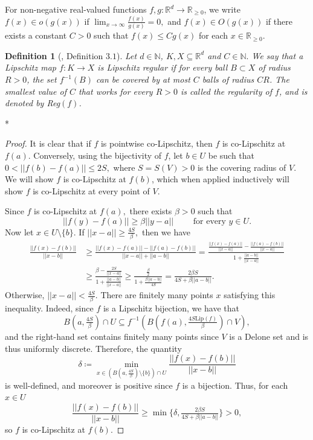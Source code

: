 \documentclass{article}
\newtheorem{define}[thm]{Definition}
\newcommand{\R}{\mathbb{R}}
\newcommand{\N}{\mathbb{N}}
\newcommand{\bilip}{\operatorname{bilip}}
\begin{document}
For non-negative real-valued functions $f,g:\R^d \to \R_{\geq 0}$, we write
    $f(x) \in o(g(x))$ if $\lim_{x \to \infty} \frac{f(x)}{g(x)} = 0,$ and $f(x) \in O(g(x))$ if there exists a constant $C>0$ such that $f(x) \leq Cg(x)$ for each $x \in \R_{\geq0}.$
    \begin{define}[\cite{viera2023delone}, Definition $3.1$] \label{define: lip reg}
    Let $d \in \N$, $K,X \subseteq \R^d$ and $C \in \N.$ We say that a Lipschitz map $f:K \to X$ is \emph{Lipschitz regular} if for every ball $B \subset X$ of radius $R > 0$, the set $f^{-1}(B)$ can
be covered by at most $C$ balls of radius $CR$. The smallest value of $C$ that works for every $R>0$ is called
the \emph{regularity} of $f$, and is denoted by \emph{Reg}$(f)$. 
\end{define}
    \bilip*
\begin{proof}
   It is clear that if $f$ is pointwise co-Lipschitz, then $f$ is co-Lipschitz at $f(a)$. Conversely, using the bijectivity of $f$, let $b \in U$ be such that $0<||f(b)-f(a)|| \leq 2S,$ where $S=S(V)>0$ is the covering radius of $V.$ We will show $f$ is co-Lipschitz at $f(b)$, which when applied inductively will show $f$ is co-Lipschitz at every point of $V$.
   
   Since $f$ is co-Lipschitz at $f(a),$ there exists $\beta>0$ such that $$||f(y)-f(a)|| \geq \beta||y-a||\qquad \text{ for every } y \in U .$$ Now let $x \in U\setminus \{b\}$. If $||x-a||\geq \frac{4S}{\beta},$ then we have 
    \begin{equation*} \label{eq: bilip estimate}
        \begin{split}
            \frac{||f(x)-f(b)||}{||x-b||} &\geq \frac{||f(x)-f(a)||- ||f(a)-f(b)||}{||x-a||+||a-b||}=\frac{\frac{||f(x)-f(a)||}{||x-a||}- \frac{||f(a)-f(b)||}{||x-a||}}{1+\frac{||a-b||}{||x-a||}} \\&\geq \frac{\beta-\frac{2S}{||x-a||}}{1+{\frac{||a-b||}{||x-a||}}}\geq \frac{\frac{\beta}{2}}{1+\frac{\beta||a-b||}{4S}} = \frac{2\beta S}{4S+\beta||a-b||}.
        \end{split}
    \end{equation*}
Otherwise, $||x-a|| < \frac{4S}{\beta}.$ There are finitely many points $x$ satisfying this inequality. Indeed, since $f$ is a Lipschitz bijection, we have that
$$B\left(a,\tfrac{4S}{\beta}\right) \cap U \subseteq f^{-1}\left(B\left(f(a),\tfrac{4S\text{Lip}(f)}{\beta}\right)\cap V\right),$$ and the right-hand set contains finitely many points since $V$ is a Delone set and is thus uniformly discrete.
Therefore, the quantity $$\delta \coloneqq \min_{x \in (B(a, \frac{4S}{\beta})\setminus \{b\})\cap U} \frac{||f(x)-f(b)||}{||x-b||}$$ is well-defined, and moreover is positive since $f$ is a bijection. Thus, for each $x \in U$
$$\frac{||f(x)-f(b)||}{||x-b||} \geq \min\bigg\{\delta, \tfrac{2\beta S}{4S+\beta||a-b||}\bigg\}>0,$$
so $f$ is co-Lipschitz at $f(b)$.
\end{proof} 
\end{document}
